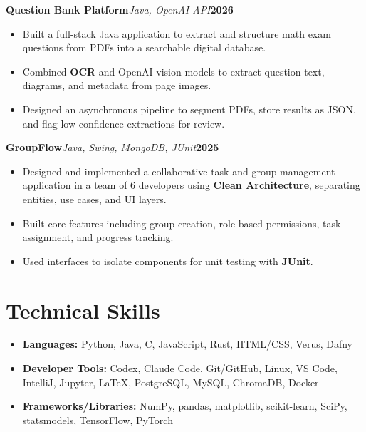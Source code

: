 \documentclass[10pt]{article}
\newcommand{\projectline}[3]{\textbf{#1}\quad\textit{#2}\hfill\textbf{#3}}
\begin{document}
\vspace{6pt}

\projectline{Question Bank Platform}{Java, OpenAI API}{2026}
\begin{itemize}
  \item Built a full-stack Java application to extract and structure math exam questions from PDFs into a searchable digital database.
  \item Combined \textbf{OCR} and OpenAI vision models to extract question text, diagrams, and metadata from page images.
  \item Designed an asynchronous pipeline to segment PDFs, store results as JSON, and flag low-confidence extractions for review.
\end{itemize}

\vspace{6pt}

\projectline{GroupFlow}{Java, Swing, MongoDB, JUnit}{2025}
\begin{itemize}
  \item Designed and implemented a collaborative task and group management application in a team of 6 developers using \textbf{Clean Architecture}, separating entities, use cases, and UI layers.
  \item Built core features including group creation, role-based permissions, task assignment, and progress tracking.
  \item Used interfaces to isolate components for unit testing with \textbf{JUnit}.
\end{itemize}

\section*{Technical Skills}
\begin{itemize}
  \item \textbf{Languages:} Python, Java, C, JavaScript, Rust, HTML/CSS, Verus, Dafny
  \item \textbf{Developer Tools:} Codex, Claude Code, Git/GitHub, Linux, VS Code, IntelliJ, Jupyter, LaTeX, PostgreSQL, MySQL, ChromaDB, Docker
  \item \textbf{Frameworks/Libraries:} NumPy, pandas, matplotlib, scikit-learn, SciPy, statsmodels, TensorFlow, PyTorch
\end{itemize}
\end{document}
